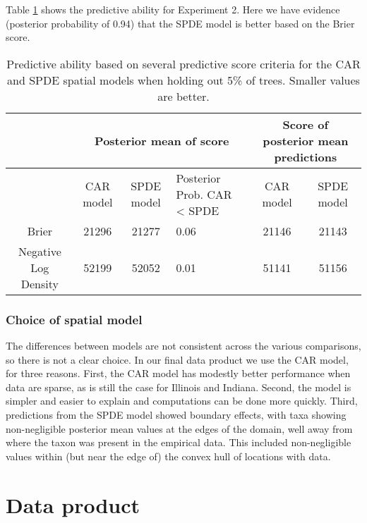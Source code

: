 \documentclass[12pt]{article}\usepackage[]{graphicx}\usepackage[]{color}
\providecommand{\tabularnewline}{\\}
\begin{document}
Table \ref{tab:score_tree} shows the predictive ability for Experiment
2. Here we have evidence (posterior probability of 0.94) that the
SPDE model is better based on the Brier score.



\begin{table}
\caption{Predictive ability based on several predictive score criteria for
the CAR and SPDE spatial models when holding out 5\% of trees. Smaller
values are better.}


\begin{tabular}{|c|c|c|>{\centering}p{3cm}|c|c|}
\hline 
 &
\multicolumn{3}{c|}{{\small{Posterior mean of score}}} &
\multicolumn{2}{c|}{{\small{Score of posterior mean predictions}}}\tabularnewline
\hline 
\hline 
 &
{\small{CAR model}} &
{\small{SPDE model}} &
{\small{Posterior Prob. CAR < SPDE}} &
{\small{CAR model}} &
{\small{SPDE model}}\tabularnewline
\hline 
{\small{Brier}} &
{\small{21296}} &
{\small{21277}} &
{\small{0.06}} &
{\small{21146}} &
{\small{21143}}\tabularnewline
\hline 
{\small{Negative Log Density}} &
{\small{52199}} &
{\small{52052}} &
{\small{0.01}} &
{\small{51141}} &
{\small{51156}}\tabularnewline
\hline 
\end{tabular}

\label{tab:score_tree}
\end{table}



\subsubsection{Choice of spatial model}

The differences between models are not consistent across the various
comparisons, so there is not a clear choice. In our final data product
we use the CAR model, for three reasons. First, the CAR model has
modestly better performance when data are sparse, as is still the
case for Illinois and Indiana. Second, the model is simpler and easier
to explain and computations can be done more quickly. Third, predictions
from the SPDE model showed boundary effects, with taxa showing non-negligible
posterior mean values at the edges of the domain, well away from where
the taxon was present in the empirical data. This included non-negligible
values within (but near the edge of) the convex hull of locations
with data. 


\section{Data product}
\end{document}
